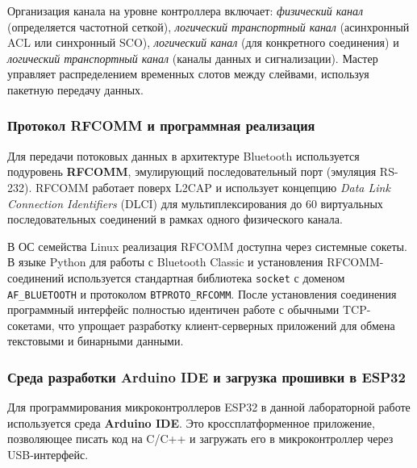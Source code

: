 Организация канала на уровне контроллера включает: \textit{физический канал} (определяется частотной сеткой), \textit{логический транспортный канал} (асинхронный ACL или синхронный SCO), \textit{логический канал} (для конкретного соединения) и \textit{логический транспортный канал} (каналы данных и сигнализации). Мастер управляет распределением временных слотов между слейвами, используя пакетную передачу данных.

\subsubsection{Протокол RFCOMM и программная реализация}
Для передачи потоковых данных в архитектуре Bluetooth используется подуровень \textbf{RFCOMM}, эмулирующий последовательный порт (эмуляция RS-232). RFCOMM работает поверх L2CAP и использует концепцию \textit{Data Link Connection Identifiers} (DLCI) для мультиплексирования до 60 виртуальных последовательных соединений в рамках одного физического канала.

В ОС семейства Linux реализация RFCOMM доступна через системные сокеты. В языке Python для работы с Bluetooth Classic и установления RFCOMM-соединений используется стандартная библиотека \texttt{socket} с доменом \texttt{AF\_BLUETOOTH} и протоколом \texttt{BTPROTO\_RFCOMM}. После установления соединения программный интерфейс полностью идентичен работе с обычными TCP-сокетами, что упрощает разработку клиент-серверных приложений для обмена текстовыми и бинарными данными.

\subsubsection{Среда разработки Arduino IDE и загрузка прошивки в ESP32}
Для программирования микроконтроллеров ESP32 в данной лабораторной работе используется среда \textbf{Arduino IDE}. Это кроссплатформенное приложение, позволяющее писать код на C/C++ и загружать его в микроконтроллер через USB-интерфейс.

